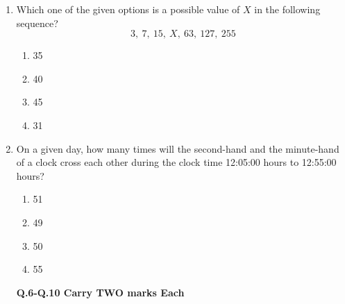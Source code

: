 \documentclass[a4paper,12pt]{exam}
\numberwithin{equation}{enumi}
\numberwithin{figure}{enumi}
\begin{document}
\begin{enumerate}
\hfill{}

\begin{multicols}{4}
\begin{enumerate}
\item $q^{p} = p^q$
\item $q^p = q^{2q}$
\item $\sqrt{q} = \sqrt{p}$
\item $\sqrt[p]{q} = \sqrt[q]{p}$
\end{enumerate}
\end{multicols}

\item Which  one of the given options is a possible value of $X$ in the following sequence?
\[
3,\ 7,\ 15,\ X,\ 63,\ 127,\ 255
\]
\hfill{}

\begin{multicols}{4}
\begin{enumerate}
\item 35
\item 40
\item 45
\item 31
\end{enumerate}
\end{multicols}

\item On a given day, how many times  will the second-hand and the minute-hand of a  clock cross each other during the clock time 12:05:00 hours to 12:55:00 hours?

\hfill{}

\begin{multicols}{4}
\begin{enumerate}
\item 51
\item 49
\item 50
\item 55
\end{enumerate}
\end{multicols}

\textbf{Q.6-Q.10 Carry TWO marks Each}
\vspace{0.2cm}



\end{enumerate}
\end{document}
